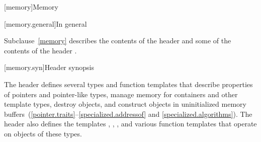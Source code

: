 [memory]{Memory}

[memory.general]{In general}

\pnum
Subclause~\ref{memory} describes the contents of the header
 and some
of the contents of the header .

[memory.syn]{Header  synopsis}

\pnum
The header  defines several types and function templates that
describe properties of pointers and pointer-like types, manage memory
for containers and other template types, destroy objects, and
construct objects in
uninitialized memory
buffers~(\ref{pointer.traits}--\ref{specialized.addressof} and \ref{specialized.algorithms}).
The header also defines the templates
, , , and various function
templates that operate on objects of these types.

